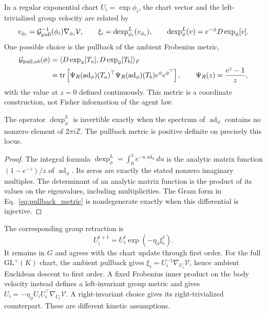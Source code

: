In a regular exponential chart $U_i=\exp\phi_i$, the chart vector and the left-trivialized group velocity are related by
\begin{equation}
v_{\phi_i}=\mathcal G_{\rm pull}^{-1}(\phi_i)\nabla_{\phi_i}\mathcal V,
\qquad
\xi_i=\operatorname{dexp}_{\phi_i}^{L}(v_{\phi_i}),
\qquad
\operatorname{dexp}_{\phi}^{L}(v)=e^{-\phi}D\exp_\phi[v].
\label{eq:gauge_natural_gradient_def}
\end{equation}
One possible choice is the pullback of the ambient Frobenius metric,
\begin{equation}
\begin{aligned}
\mathcal G_{{\rm pull},ab}(\phi)
&=\langle D\exp_\phi[T_a],D\exp_\phi[T_b]\rangle_F\\
&=\operatorname{tr}\left[\Psi_R(\operatorname{ad}_\phi)(T_a)^\top
\Psi_R(\operatorname{ad}_\phi)(T_b)e^\phi e^{\phi^\top}\right],
\qquad \Psi_R(z)=\frac{e^z-1}{z},
\end{aligned}
\label{eq:pullback_metric}
\end{equation}
with the value at $z=0$ defined continuously. This metric is a coordinate construction, not Fisher information of the agent law.

\begin{proposition}\label{prop:dexp_regularity}
The operator $\operatorname{dexp}_{\phi}^{L}$ is invertible exactly when the spectrum of $\operatorname{ad}_\phi$ contains no nonzero element of $2\pi i\mathbb Z$. The pullback metric is positive definite on precisely this locus.
\end{proposition}
\begin{proof}
The integral formula $\operatorname{dexp}_{\phi}^{L}=\int_0^1e^{-u\operatorname{ad}_\phi}du$ is the analytic matrix function $(1-e^{-z})/z$ of $\operatorname{ad}_\phi$. Its zeros are exactly the stated nonzero imaginary multiples. The determinant of an analytic matrix function is the product of its values on the eigenvalues, including multiplicities. The Gram form in Eq.~\eqref{eq:pullback_metric} is nondegenerate exactly when this differential is injective.
\end{proof}
The corresponding group retraction is
\begin{equation}
U_i^{t+1}=U_i^t\exp(-\eta_\phi\xi_i^t).
\label{eq:gauge_group_retraction}
\end{equation}
It remains in $G$ and agrees with the chart update through first order. For the full $\mathrm{GL}^+(K)$ chart, the ambient pullback gives $\xi_i=U_i^{-1}\nabla_{U_i}\mathcal V$, hence ambient Euclidean descent to first order. A fixed Frobenius inner product on the body velocity instead defines a left-invariant group metric and gives $\dot U_i=-\eta_\phi U_iU_i^\top\nabla_{U_i}\mathcal V$. A right-invariant choice gives its right-trivialized counterpart. These are different kinetic assumptions.

